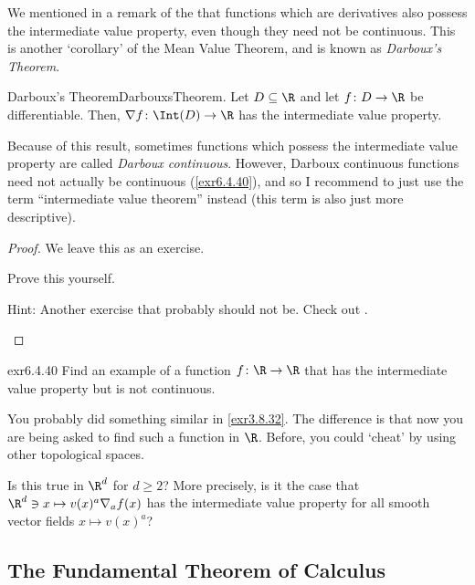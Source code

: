 We mentioned in a remark of the  that functions which are derivatives also possess the intermediate value property, even though they need not be continuous.  This is another `corollary' of the Mean Value Theorem, and is known as \emph{Darboux's Theorem}.
\begin{thm}{Darboux's Theorem}{DarbouxsTheorem}.
Let $D\subseteq \R$ and let $f\colon D\rightarrow \R$ be differentiable.  Then, $\nabla f\colon \Int (D)\rightarrow \R$ has the intermediate value property.
\begin{rmk}
Because of this result, sometimes functions which possess the intermediate value property are called \emph{Darboux continuous}.  However, Darboux continuous functions need not actually be continuous (\cref{exr6.4.40}), and so I recommend to just use the term ``intermediate value theorem'' instead (this term is also just more descriptive).
\end{rmk}
\begin{proof}
We leave this as an exercise.
\begin{exr}[breakable=false]{}{}
Prove this yourself.
\begin{rmk}
Hint:  Another exercise that probably should not be.  Check out \cite[pg.~144]{Pugh}.
\end{rmk}
\end{exr}
\end{proof}
\end{thm}
\begin{exr}{}{exr6.4.40}
Find an example of a function $f\colon \R \rightarrow \R$ that has the intermediate value property but is not continuous.
\begin{rmk}
You probably did something similar in \cref{exr3.8.32}.  The difference is that now you are being asked to find such a function in $\R$.  Before, you could `cheat' by using other topological spaces.
\end{rmk}
\end{exr}
\begin{exr}{}{}
Is this true in $\R ^d$ for $d\geq 2$?  More precisely, is it the case that $\R ^d\ni x\mapsto v(x)^a\nabla _af(x)$ has the intermediate value property for all smooth vector fields $x\mapsto v(x)^a$?
\end{exr}

\subsection{The Fundamental Theorem of Calculus}

